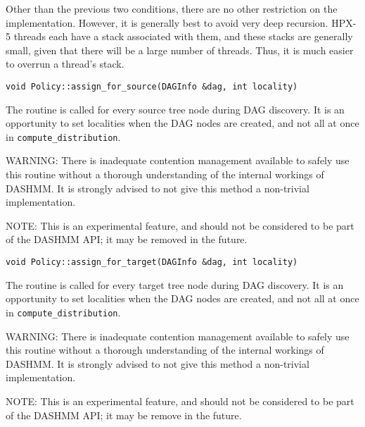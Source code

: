 Other than the previous two conditions, there are no other restriction on the
implementation. However, it is generally best to avoid very deep recursion.
HPX-5 threads each have a stack associated with them, and these stacks are
generally small, given that there will be a large number of threads. Thus, it
is much easier to overrun a thread's stack.

\begin{lstlisting}
void Policy::assign_for_source(DAGInfo &dag, int locality)
\end{lstlisting}

\noindent
The routine is called for every source tree node during DAG discovery. It is an
opportunity to set localities when the DAG nodes are created, and not all at
once in \texttt{compute\_distribution}.

WARNING: There is inadequate contention management available to safely use this
routine without a thorough understanding of the internal workings of DASHMM.
It is strongly advised to not give this method a non-trivial implementation.

NOTE: This is an experimental feature, and should not be considered to be part
of the DASHMM API; it may be removed in the future.

\begin{lstlisting}
void Policy::assign_for_target(DAGInfo &dag, int locality)
\end{lstlisting}

\noindent
The routine is called for every target tree node during DAG discovery. It is an
opportunity to set localities when the DAG nodes are created, and not all at
once in \texttt{compute\_distribution}.

WARNING: There is inadequate contention management available to safely use this
routine without a thorough understanding of the internal workings of DASHMM.
It is strongly advised to not give this method a non-trivial implementation.

NOTE: This is an experimental feature, and should not be considered to be part
of the DASHMM API; it may be remove in the future.
